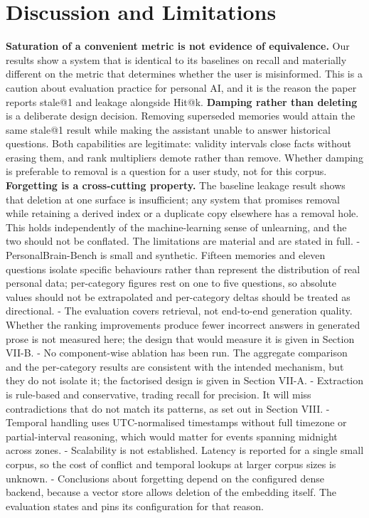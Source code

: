 \documentclass[conference]{IEEEtran}
\begin{document}
\section{Discussion and Limitations}
\textbf{Saturation of a convenient metric is not evidence of equivalence.} Our results show a system that is identical to its baselines on recall and materially different on the metric that determines whether the user is misinformed. This is a caution about evaluation practice for personal AI, and it is the reason the paper reports stale@1 and leakage alongside Hit@k.
\textbf{Damping rather than deleting} is a deliberate design decision. Removing superseded memories would attain the same stale@1 result while making the assistant unable to answer historical questions. Both capabilities are legitimate: validity intervals close facts without erasing them, and rank multipliers demote rather than remove. Whether damping is preferable to removal is a question for a user study, not for this corpus.
\textbf{Forgetting is a cross-cutting property.} The baseline leakage result shows that deletion at one surface is insufficient; any system that promises removal while retaining a derived index or a duplicate copy elsewhere has a removal hole. This holds independently of the machine-learning sense of unlearning, and the two should not be conflated.
The limitations are material and are stated in full.
- PersonalBrain-Bench is small and synthetic. Fifteen memories and eleven questions isolate specific behaviours rather than represent the distribution of real personal data; per-category figures rest on one to five questions, so absolute values should not be extrapolated and per-category deltas should be treated as directional.
- The evaluation covers retrieval, not end-to-end generation quality. Whether the ranking improvements produce fewer incorrect answers in generated prose is not measured here; the design that would measure it is given in Section VII-B.
- No component-wise ablation has been run. The aggregate comparison and the per-category results are consistent with the intended mechanism, but they do not isolate it; the factorised design is given in Section VII-A.
- Extraction is rule-based and conservative, trading recall for precision. It will miss contradictions that do not match its patterns, as set out in Section VIII.
- Temporal handling uses UTC-normalised timestamps without full timezone or partial-interval reasoning, which would matter for events spanning midnight across zones.
- Scalability is not established. Latency is reported for a single small corpus, so the cost of conflict and temporal lookups at larger corpus sizes is unknown.
- Conclusions about forgetting depend on the configured dense backend, because a vector store allows deletion of the embedding itself. The evaluation states and pins its configuration for that reason.
\end{document}
